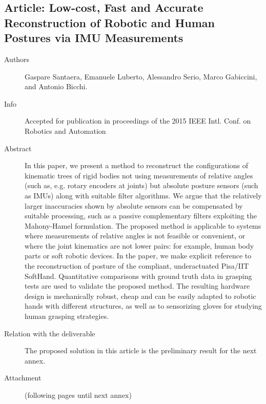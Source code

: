 \documentclass[a4paper,11pt,pdf]{pacmanreport}
\begin{document}
\subsection{Article: Low-cost, Fast and Accurate Reconstruction of Robotic and Human Postures via IMU Measurements} \label{sec:imu2Fingers}
\begin{description}
	\item[Authors] Gaspare Santaera, Emanuele Luberto, Alessandro Serio, Marco Gabiccini, and Antonio Bicchi.
	\item[Info] Accepted for publication in proceedings of the 2015 IEEE Intl. Conf. on Robotics and Automation
	\item[Abstract] In this paper, we present a method to reconstruct the configurations of kinematic trees of rigid bodies not using
measurements of relative angles (such as, e.g. rotary encoders at joints) but absolute posture sensors (such as IMUs) along with suitable filter algorithms. We argue that the relatively larger inaccuracies shown by absolute sensors can be compensated by suitable processing, such as a passive complementary filters exploiting the Mahony-Hamel formulation. The proposed method is applicable to  systems where measurements of relative angles is not feasible or convenient, or where the joint kinematics are not lower pairs: for example, human body parts or soft robotic devices. In the paper, we make explicit reference to the reconstruction of posture of the compliant, underactuated Pisa/IIT SoftHand. Quantitative comparisons with ground truth data in grasping tests are used to validate the proposed method. The resulting hardware design is mechanically robust, cheap and can be easily adapted to robotic hands with different structures, as well as to sensorizing gloves for studying human grasping strategies.
	\item[Relation with the deliverable] The proposed solution in this article is the preliminary result for the next annex.
	\item[Attachment] (following pages until next annex)
\end{description}

\end{document}
